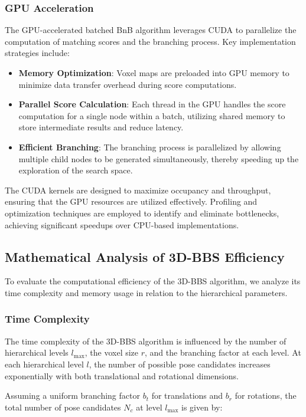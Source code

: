 \subsubsection{GPU Acceleration}
The GPU-accelerated batched BnB algorithm leverages CUDA to parallelize the computation of matching scores and the branching process. Key implementation strategies include:

\begin{itemize}
    \item \textbf{Memory Optimization}: Voxel maps are preloaded into GPU memory to minimize data transfer overhead during score computations.
    \item \textbf{Parallel Score Calculation}: Each thread in the GPU handles the score computation for a single node within a batch, utilizing shared memory to store intermediate results and reduce latency.
    \item \textbf{Efficient Branching}: The branching process is parallelized by allowing multiple child nodes to be generated simultaneously, thereby speeding up the exploration of the search space.
\end{itemize}

The CUDA kernels are designed to maximize occupancy and throughput, ensuring that the GPU resources are utilized effectively. Profiling and optimization techniques are employed to identify and eliminate bottlenecks, achieving significant speedups over CPU-based implementations.

\subsection{Mathematical Analysis of 3D-BBS Efficiency}
To evaluate the computational efficiency of the 3D-BBS algorithm, we analyze its time complexity and memory usage in relation to the hierarchical parameters.

\subsubsection{Time Complexity}
The time complexity of the 3D-BBS algorithm is influenced by the number of hierarchical levels $l_{\text{max}}$, the voxel size $r$, and the branching factor at each level. At each hierarchical level $l$, the number of possible pose candidates increases exponentially with both translational and rotational dimensions.

Assuming a uniform branching factor $b_t$ for translations and $b_r$ for rotations, the total number of pose candidates $N_c$ at level $l_{\text{max}}$ is given by:

